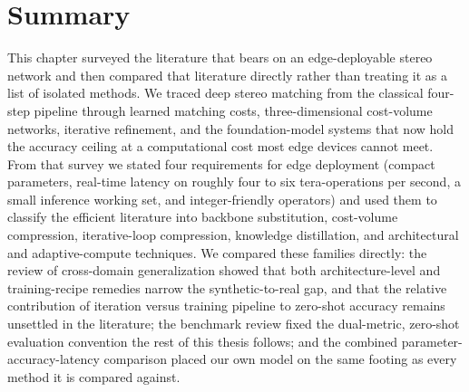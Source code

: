 \section{Summary}
\label{sec:ch2_summary}
This chapter surveyed the literature that bears on an edge-deployable
stereo network and then compared that literature directly rather than
treating it as a list of isolated methods. We traced deep stereo
matching from the classical four-step pipeline through learned matching
costs, three-dimensional cost-volume networks, iterative refinement, and
the foundation-model systems that now hold the accuracy ceiling at a
computational cost most edge devices cannot meet. From that survey we
stated four requirements for edge deployment (compact parameters,
real-time latency on roughly four to six tera-operations per second, a
small inference working set, and integer-friendly operators) and used
them to classify the efficient literature into backbone substitution,
cost-volume compression, iterative-loop compression, knowledge
distillation, and architectural and adaptive-compute techniques. We
compared these families directly: the review of cross-domain
generalization showed that both architecture-level and training-recipe
remedies narrow the synthetic-to-real gap, and that the relative
contribution of iteration versus training pipeline to zero-shot accuracy
remains unsettled in the literature; the benchmark review fixed the
dual-metric, zero-shot evaluation convention the rest of this thesis
follows; and the combined parameter-accuracy-latency comparison placed
our own model on the same footing as every method it is compared
against.

